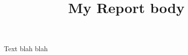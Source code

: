 \documentclass{article}
\begin{document}
\title{My Report body}

\maketitle


Text blah blah
\end{document}
